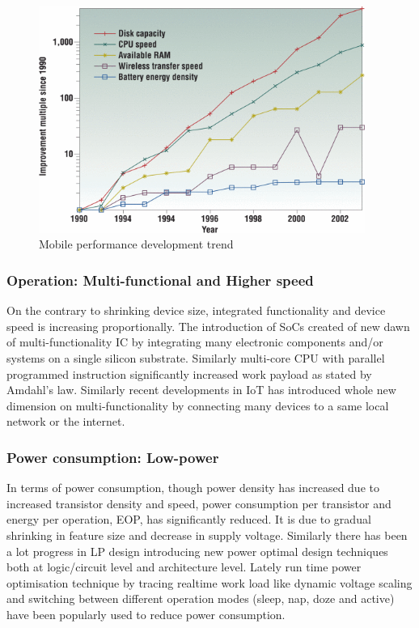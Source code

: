 \documentclass[12pt,a4paper,UKenglish]{report}
\begin{document}
\begin{figure}[!htbp] %
   \centering
   \includegraphics[width=0.95\textwidth]{img/comp_tech_batt.png}
   \caption{Mobile performance development trend \cite{mobile_performance}}
   \label{fig:comp_tech_batt}
\end{figure}

\subsubsection{Operation: Multi-functional and Higher speed}

On the contrary to shrinking device size, integrated functionality and device speed is increasing proportionally. 
The introduction of SoCs created of new dawn of multi-functionality IC by integrating many electronic components 
and/or systems on a single silicon substrate. Similarly multi-core CPU with parallel programmed instruction  
significantly increased work payload as stated by Amdahl's law. Similarly recent developments in IoT has 
introduced whole new dimension on multi-functionality by connecting many devices to a same local network or 
the internet\cite{iot_intro}. \\

\subsubsection{Power consumption: Low-power}

In terms of power consumption, though power density has increased due to increased transistor density and speed, 
power consumption per transistor and energy per operation, EOP, has significantly reduced. It is due to gradual 
shrinking in feature size and decrease in supply voltage. Similarly there has been a lot progress in LP design 
introducing new power optimal design techniques both at logic/circuit level and architecture level. Lately run 
time power optimisation technique by tracing realtime work load like dynamic voltage scaling and switching 
between different operation modes (sleep, nap, doze and active) have been popularly used to reduce power 
consumption\cite{rabaey_2009}. \\
\end{document}
